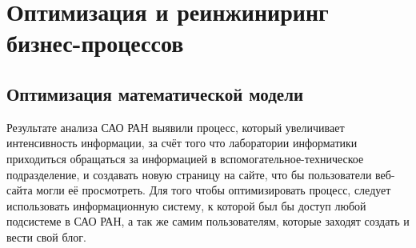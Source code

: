 \section{Оптимизация и реинжиниринг бизнес-процессов}
\subsection{Оптимизация математической модели}
Результате анализа САО РАН выявили процесс, который увеличивает интенсивность информации, за счёт того что лаборатории информатики приходиться обращаться за информацией в вспомогательное-техническое подразделение, и создавать новую страницу на сайте, что бы пользователи веб-сайта могли её просмотреть. Для того чтобы оптимизировать процесс, следует использовать информационную систему, к которой был бы доступ любой подсистеме в САО РАН, а так же самим пользователям, которые заходят создать и вести свой блог.
\pagebreak